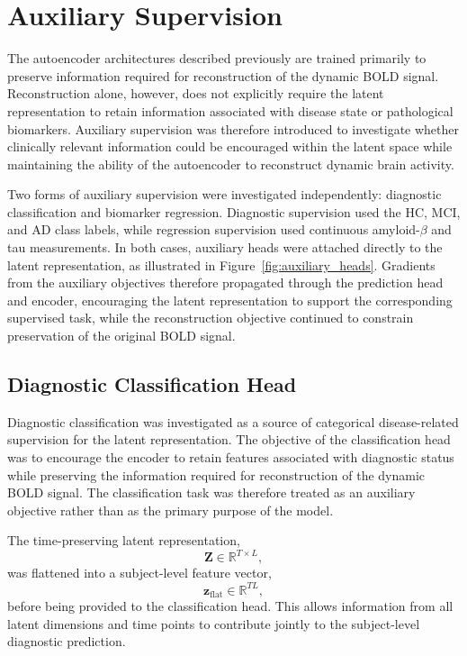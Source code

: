 \section{Auxiliary Supervision}

The autoencoder architectures described previously are trained primarily
to preserve information required for reconstruction of the dynamic BOLD
signal. Reconstruction alone, however, does not explicitly require the
latent representation to retain information associated with disease state
or pathological biomarkers. Auxiliary supervision was therefore introduced
to investigate whether clinically relevant information could be encouraged
within the latent space while maintaining the ability of the autoencoder
to reconstruct dynamic brain activity.

Two forms of auxiliary supervision were investigated independently:
diagnostic classification and biomarker regression. Diagnostic supervision
used the HC, MCI, and AD class labels, while regression supervision used
continuous amyloid-$\beta$ and tau measurements. In both cases, auxiliary
heads were attached directly to the latent representation, as illustrated
in Figure~\ref{fig:auxiliary_heads}. Gradients from the auxiliary objectives
therefore propagated through the prediction head and encoder, encouraging
the latent representation to support the corresponding supervised task,
while the reconstruction objective continued to constrain preservation of
the original BOLD signal.






\subsection{Diagnostic Classification Head}

Diagnostic classification was investigated as a source of categorical
disease-related supervision for the latent representation. The objective
of the classification head was to encourage the encoder to retain features
associated with diagnostic status while preserving the information required
for reconstruction of the dynamic BOLD signal. The classification task was
therefore treated as an auxiliary objective rather than as the primary
purpose of the model.

The time-preserving latent representation,
\[
\mathbf{Z}\in\mathbb{R}^{T\times L},
\]
was flattened into a subject-level feature vector,
\[
\mathbf{z}_{\mathrm{flat}}\in\mathbb{R}^{TL},
\]
before being provided to the classification head. This allows information
from all latent dimensions and time points to contribute jointly to the
subject-level diagnostic prediction. 

